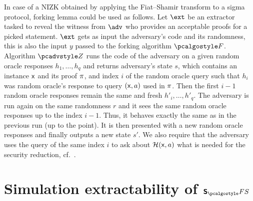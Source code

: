 \let\accentvec\vec \documentclass[runningheads]{llncs}
\begin{document}
In case of a NIZK obtained by applying the Fiat--Shamir transform to a sigma
protocol, forking lemma could be used as follows.  Let $\ext$ be an extractor
tasked to reveal the witness from $\adv$ who
provides an acceptable proofs for a picked statement. $\ext$ gets as input
the adversary's code and its randomness, this is also the input $y$ passed to the
forking algorithm $\forking$. Algorithm $\zdv$ runs the code of the adversary
on a
given random oracle responses $h_1, \ldots, h_q$ and returns adversary's
state $s$, which contains an instance $\mathsf{x}$ and its proof $\pi$, and
index $i$ of the random oracle query such that $h_i$ was random oracle's response to
query $(\mathsf{x}, a)$ used in $\pi$. Then the first $i - 1$
random oracle responses remain the same and fresh $h'_i, \ldots, h'_q$. 
The adversary is run again on the same
randomness $r$ and it sees the same random oracle responses up to the index $i
- 1$. Thus, it behaves exactly the same as in the previous run (up to the point). It
is then presented with a new random oracle responses and finally outputs a new
state $s'$. We also require that the adversary uses the query of the same
index $i$ to ask about $\mathcal{H}(\mathsf{x}, a)$ what is needed for the security
reduction, cf.~\cite{CCS:BelNev06}.




\section{Simulation extractability of $\sonicprotfs$}
\label{sec:sonic}
\end{document}
